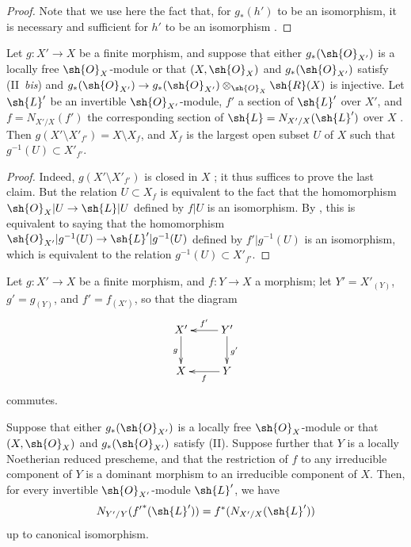 \begin{proof}
Note that we use here the fact that, for $g_*(h')$ to be an isomorphism, it is necessary and sufficient for $h'$ to be an isomorphism .
\end{proof}

\begin{corollary}[6.5.7]
\label{II.6.5.7}
Let $g:X'\to X$ be a finite morphism, and suppose that either $g_*(\sh{O}_{X'})$ is a locally free $\sh{O}_X$-module or that $(X,\sh{O}_X)$ and $g_*(\sh{O}_{X'})$ satisfy (II~\emph{bis}) and $g_*(\sh{O}_{X'})\to g_*(\sh{O}_{X'})\otimes_{\sh{O}_X}\sh{R}(X)$ is injective.
Let $\sh{L}'$ be an invertible $\sh{O}_{X'}$-module, $f'$ a section of $\sh{L}'$ over $X'$, and $f=N_{X'/X}(f')$ the corresponding section of $\sh{L}=N_{X'/X}(\sh{L}')$ over $X$ .
Then $g(X'\setminus X'_{f'})=X\setminus X_f$, and $X_f$ is the largest open subset $U$ of $X$ such that $g^{-1}(U)\subset X'_{f'}$.
\end{corollary}

\begin{proof}
Indeed, $g(X'\setminus X'_{f'})$ is closed in $X$ ;
it thus suffices to prove the last claim.
But the relation $U\subset X_f$ is equivalent to the fact that the homomorphism $\sh{O}_X|U\to\sh{L}|U$ defined by $f|U$ is an isomorphism.
By , this is equivalent to saying that the homomorphism $\sh{O}_{X'}|g^{-1}(U)\to\sh{L}'|g^{-1}(U)$ defined by $f'|g^{-1}(U)$ is an isomorphism, which is equivalent to the relation $g^{-1}(U)\subset X'_{f'}$.
\end{proof}

\begin{proposition}[6.5.8]
\label{II.6.5.8}
Let $g:X'\to X$ be a finite morphism, and $f:Y\to X$ a morphism;
let $Y'=X'_{(Y)}$, $g'=g_{(Y)}$, and $f'=f_{(X')}$, so that the diagram
\[
  \xymatrix{
    X' \ar[d]_{g}
    & Y' \ar[l]_{f'} \ar[d]^{g'}
  \\X
    & Y \ar[l]^{f}
  }
\]
commutes.

Suppose that either $g_*(\sh{O}_{X'})$ is a locally free $\sh{O}_X$-module or that $(X,\sh{O}_X)$ and $g_*(\sh{O}_{X'})$ satisfy (II).
Suppose further that $Y$ is a locally Noetherian reduced prescheme, and that the restriction of $f$ to any irreducible component of $Y$ is a dominant morphism to an irreducible component of $X$.
Then, for every invertible $\sh{O}_{X'}$-module $\sh{L}'$, we have
\[
  N_{Y'/Y}({f'}^*(\sh{L}')) = f^*(N_{X'/X}(\sh{L}'))
\]
up to canonical isomorphism.
\end{proposition}

